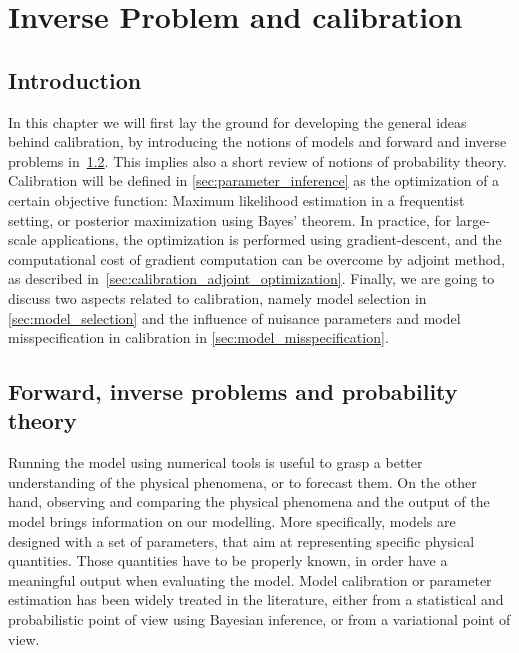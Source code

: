 \documentclass[../../Main_ManuscritThese.tex]{subfiles}
\begin{document}
\dominitoc
\faketableofcontents
\showthe\columnwidth
\chapter{Inverse Problem and calibration}
\label{chap:inverse_problem}

\minitoc
{}
\listoftodos
\newpage
\subfileLocal{\pagestyle{contentStyle}}

\section{Introduction}
\label{sec:intro_chap2}
In this chapter we will first lay the ground for developing the general ideas behind calibration, by introducing the notions of models and forward and inverse problems in~\cref{sec:forward_inverse_problem_proba_theory}. This implies also a short review of notions of probability theory. Calibration will be defined in \cref{sec:parameter_inference} as the optimization of a certain objective function: Maximum likelihood estimation in a frequentist setting, or posterior maximization using Bayes' theorem. In practice, for large-scale applications, the optimization is performed using gradient-descent, and the computational cost of gradient computation can be overcome by adjoint method, as described in~\cref{sec:calibration_adjoint_optimization}. Finally, we are going to discuss two aspects related to calibration, namely model selection in \cref{sec:model_selection} and the influence of nuisance parameters and model misspecification in calibration in \cref{sec:model_misspecification}.

\section{Forward, inverse problems and probability theory}
\label{sec:forward_inverse_problem_proba_theory}
Running the model using numerical tools is useful to grasp a better understanding of the physical phenomena, or to forecast them. On the other hand, observing and comparing the physical phenomena and the output of the model brings information on our modelling. More specifically, models are designed with a set of parameters, that aim at representing specific physical quantities. Those quantities have to be properly known, in order have a meaningful output when evaluating the model. 
Model calibration or parameter estimation has been widely treated in the literature, either from a statistical and probabilistic point of view using Bayesian inference, or from a variational point of view.
\end{document}
